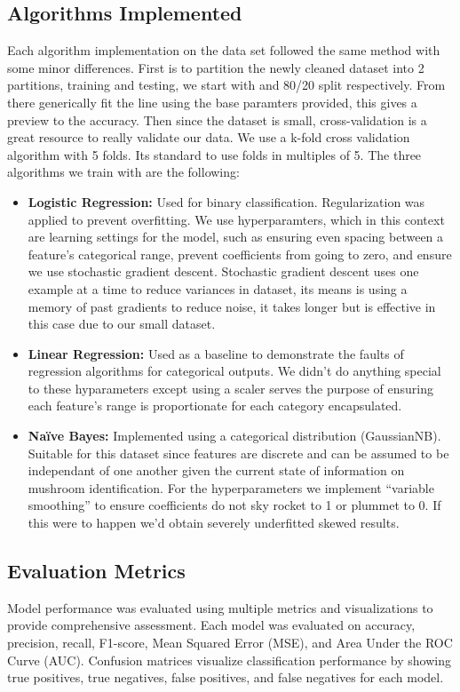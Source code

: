 \documentclass[conference]{IEEEtran}
\begin{document}
\subsection{Algorithms Implemented}
    Each algorithm implementation on the data set followed the same method with some minor differences. First is to partition the newly cleaned dataset into 2 partitions, training and testing, we start with and 80/20 split respectively. From there generically fit the line using the base paramters provided, this gives a preview to the accuracy. Then since the dataset is small, cross-validation is a great resource to really validate our data. We use a k-fold cross validation algorithm with 5 folds. Its standard to use folds in multiples of 5. The three algorithms we train with are the following:
\begin{itemize}
    \item \textbf{Logistic Regression:} Used for binary classification. Regularization was applied to prevent overfitting. We use hyperparamters, which in this context are learning settings for the model, such as ensuring even spacing between a feature's categorical range, prevent coefficients from going to zero, and ensure we use stochastic gradient descent. Stochastic gradient descent uses one example at a time to reduce variances in dataset, its means is using a memory of past gradients to reduce noise, it takes longer but is effective in this case due to our small dataset.

    \item \textbf{Linear Regression:} Used as a baseline to demonstrate the faults of regression algorithms for categorical outputs. We didn't do anything special to these hyparameters except using a scaler serves the purpose of ensuring each feature's range is proportionate for each category encapsulated. 
    
    \item \textbf{Naïve Bayes:} Implemented using a categorical distribution (GaussianNB). Suitable for this dataset since features are discrete and can be assumed to be independant of one another given the current state of information on mushroom identification. For the hyperparameters we implement ``variable smoothing'' to ensure coefficients do not sky rocket to 1 or plummet to 0. If this were to happen we'd obtain severely underfitted skewed results.
\end{itemize}

\subsection{Evaluation Metrics}
Model performance was evaluated using multiple metrics and visualizations to provide comprehensive assessment. Each model was evaluated on accuracy, precision, recall, F1-score, Mean Squared Error (MSE), and Area Under the ROC Curve (AUC). Confusion matrices visualize classification performance by showing true positives, true negatives, false positives, and false negatives for each model. 
\end{document}
